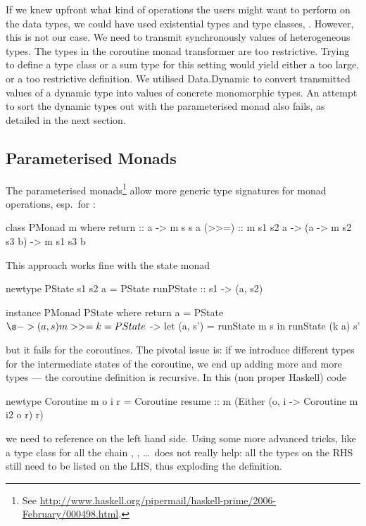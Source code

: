 
If we knew upfront what kind of operations the users might want to perform on the data types, we could have used existential types and type classes, \viz \cite{Laufer:1994:PTI:186025.186031,Kiselyov:2004:STH:1017472.1017488}.
However, this is not our case.
We need to transmit synchronously values of heterogeneous types. 
The types in the coroutine monad transformer are too restrictive.
Trying to define a type class or a sum type for this setting would yield either a too large, or a too restrictive definition.
%
We utilised \textsf{Data.Dynamic} to convert transmitted values of a dynamic type into values of concrete monomorphic types.
An attempt to sort the dynamic types out with the parameterised monad also fails, as detailed in the next section.

\subsection{Parameterised Monads}
The parameterised monads\footnote{See \url{http://www.haskell.org/pipermail/haskell-prime/2006-February/000498.html}.}  allow more generic type signatures for monad operations, esp.\ for \hs{>>=}\xspace\nolinebreak[4] \cite{monad-parametrisable}:
\begin{code}
class PMonad m where
return :: a -> m s s a
(>>=)  :: m s1 s2 a -> (a -> m s2 s3 b) -> m s1 s3 b
\end{code}
This approach works fine with the state monad
\begin{code}
newtype PState s1 s2 a 
  = PState { runPState :: s1 -> (a, s2) }

instance PMonad PState where
return a = PState $ \s -> (a, s)
m >>= k  = PState $ \s -> let (a, s') = runState m s
                         in runState (k a) s'
\end{code}
but it fails for the coroutines. The pivotal issue is: if we introduce different types for the intermediate states of the coroutine, we end up adding more and more types --- the coroutine definition is recursive. In this (non proper Haskell) code
\begin{code}
newtype Coroutine m o i r 
  = Coroutine { resume :: m (Either (o, i 
     -> Coroutine m i2 o r)  r) }
\end{code}
we need to reference  on the left hand side. Using some more advanced tricks, like a type class for all the chain , , \dots\ does not really help: all the types on the RHS still need to be listed on the LHS, thus exploding the definition.

